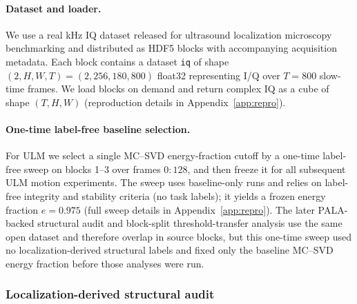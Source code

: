 \documentclass[11pt]{article}
\newif\ifSTAPPAPERONLY
\newcommand{\SuppOrApp}[1]{\ifSTAPPAPERONLY Supplementary Material\else Appendix~\ref{#1}\fi}
\begin{document}
\paragraph{Dataset and loader.}
We use a real kHz IQ dataset released for ultrasound localization microscopy benchmarking \cite{ChavignonZenodo7883227,HeilesULMBenchmark2021} and distributed as HDF5 blocks with accompanying acquisition metadata. Each block contains a dataset \texttt{iq} of shape $(2,H,W,T)=(2,256,180,800)$ float32 representing I/Q over $T=800$ slow-time frames. We load blocks on demand and return complex IQ as a cube of shape $(T,H,W)$ (reproduction details in \SuppOrApp{app:repro}).

\paragraph{One-time label-free baseline selection.}
For ULM we select a single MC--SVD energy-fraction cutoff by a one-time label-free sweep on blocks 1--3 over frames $0{:}128$, and then freeze it for all subsequent ULM motion experiments. The sweep uses baseline-only runs and relies on label-free integrity and stability criteria (no task labels); it yields a frozen energy fraction $e=0.975$ (full sweep details in \SuppOrApp{app:repro}). The later PALA-backed structural audit and block-split threshold-transfer analysis use the same open dataset and therefore overlap in source blocks, but this one-time sweep used no localization-derived structural labels and fixed only the baseline MC--SVD energy fraction before those analyses were run.

\subsubsection{Localization-derived structural audit}
\end{document}
